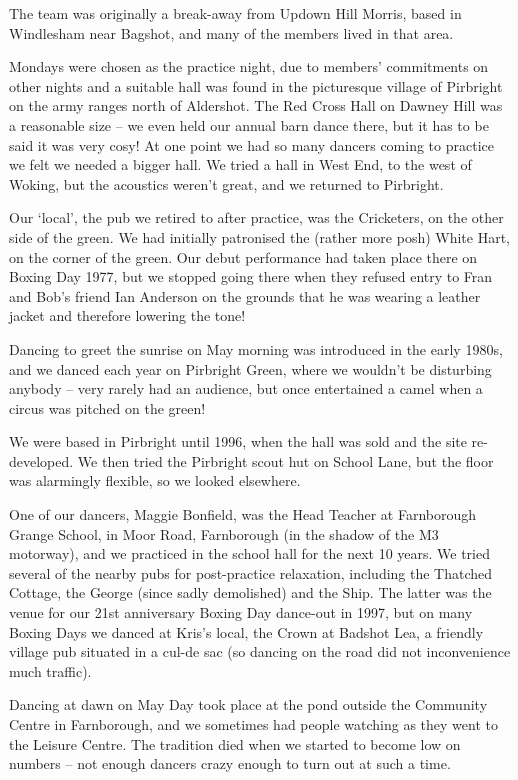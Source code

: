 \documentclass[
]{article}
\begin{document}
The team was originally a break-away from Updown Hill Morris, based in
Windlesham near Bagshot, and many of the members lived in that area.

Mondays were chosen as the practice night, due to members' commitments
on other nights and a suitable hall was found in the picturesque village
of Pirbright on the army ranges north of Aldershot. The Red Cross Hall
on Dawney Hill was a reasonable size -- we even held our annual barn
dance there, but it has to be said it was very cosy! At one point we had
so many dancers coming to practice we felt we needed a bigger hall. We
tried a hall in West End, to the west of Woking, but the acoustics
weren't great, and we returned to Pirbright.

Our `local', the pub we retired to after practice, was the Cricketers,
on the other side of the green. We had initially patronised the (rather
more posh) White Hart, on the corner of the green. Our debut performance
had taken place there on Boxing Day 1977, but we stopped going there
when they refused entry to Fran and Bob's friend Ian Anderson on the
grounds that he was wearing a leather jacket and therefore lowering the
tone!

Dancing to greet the sunrise on May morning was introduced in the early
1980s, and we danced each year on Pirbright Green, where we wouldn't be
disturbing anybody -- very rarely had an audience, but once entertained
a camel when a circus was pitched on the green!

We were based in Pirbright until 1996, when the hall was sold and the
site re-developed. We then tried the Pirbright scout hut on School Lane,
but the floor was alarmingly flexible, so we looked elsewhere.

One of our dancers, Maggie Bonfield, was the Head Teacher at Farnborough
Grange School, in Moor Road, Farnborough (in the shadow of the M3
motorway), and we practiced in the school hall for the next 10 years. We
tried several of the nearby pubs for post-practice relaxation, including
the Thatched Cottage, the George (since sadly demolished) and the Ship.
The latter was the venue for our 21st anniversary Boxing Day dance-out
in 1997, but on many Boxing Days we danced at Kris's local, the Crown at
Badshot Lea, a friendly village pub situated in a cul-de sac (so dancing
on the road did not inconvenience much traffic).

Dancing at dawn on May Day took place at the pond outside the Community
Centre in Farnborough, and we sometimes had people watching as they went
to the Leisure Centre. The tradition died when we started to become low
on numbers -- not enough dancers crazy enough to turn out at such a
time.
\end{document}
